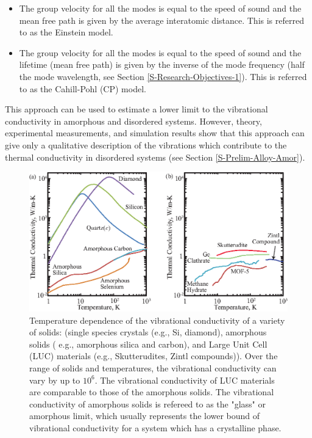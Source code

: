 \documentclass[letterpaper,12pt]{article}
\begin{document}
\begin{itemize}
\item The group velocity for all the modes is
equal to the speed of sound and the mean free path is given
by the average interatomic distance. \cite{einstein1911,kittel1949} This is referred to as the Einstein model.
\item The group velocity for all the modes is
equal to the speed of sound and the lifetime (mean free path) is given
by the inverse of the mode frequency (half the mode wavelength, see Section \ref{S-Research-Objectives-1}).\cite{cahill1992} This is referred to as the Cahill-Pohl (CP) model.
\end{itemize}
This approach can be used to estimate a lower limit to the vibrational conductivity in amorphous and disordered systems.\cite{cahill1987,cahill1992} However, theory\cite{allen1993}, experimental measurements\cite{PhysRevB.34.5696}, and simulation results\cite{shenogin2009} show that this approach can give only a qualitative description of the vibrations which contribute to the thermal conductivity in disordered systems (see Section \ref{S-Prelim-Alloy-Amor}).
\begin{figure}
\begin{center}
\includegraphics[scale=1.0]{k.eps}
\vspace*{-5mm}
\end{center}
\caption{\label{FIG:k_thermal_solids}Temperature dependence of the vibrational conductivity of a variety of solids: (single species crystals (e.g., Si, diamond), amorphous solids ( e.g., amorphous silica and carbon), and Large Unit Cell (LUC) materials (e.g., Skutterudites, Zintl compounds)). Over the range of solids and temperatures, the vibrational conductivity can vary by up to $10^6$. The vibrational conductivity of LUC materials are comparable to those of the amorphous solids. The vibrational conductivity of amorphous solids is refereed to as the "glass" or amorphous limit, which usually represents the lower bound of vibrational conductivity for a system which has a crystalline phase.\cite{cahill1987,cahill1992} }
\end{figure}
\clearpage
\end{document}
